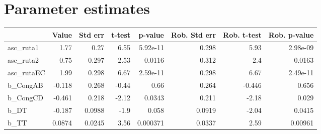 \section{Parameter estimates}
\begin{tabular}{lrrrrrrr}
\toprule
{} &  Value &  Std err &  t-test &  p-value &  Rob. Std err &  Rob. t-test &  Rob. p-value \\
\midrule
asc\_ruta1  &   1.77 &     0.27 &    6.55 & 5.92e-11 &         0.298 &         5.93 &      2.98e-09 \\
asc\_ruta2  &   0.75 &    0.297 &    2.53 &   0.0116 &         0.312 &          2.4 &        0.0163 \\
asc\_rutaEC &   1.99 &    0.298 &    6.67 & 2.59e-11 &         0.298 &         6.67 &      2.49e-11 \\
b\_CongAB   & -0.118 &    0.268 &   -0.44 &     0.66 &         0.264 &       -0.446 &         0.656 \\
b\_CongCD   & -0.461 &    0.218 &   -2.12 &   0.0343 &         0.211 &        -2.18 &         0.029 \\
b\_DT       & -0.187 &   0.0988 &    -1.9 &    0.058 &        0.0919 &        -2.04 &        0.0415 \\
b\_TT       & 0.0874 &   0.0245 &    3.56 & 0.000371 &        0.0337 &         2.59 &       0.00961 \\
\bottomrule
\end{tabular}

